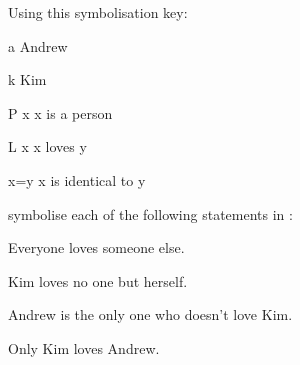 \documentclass[PHIL101-Textbook.tex]{subfiles}
\begin{document}
\pagebreak
\practiceproblems
\solutions
\problempart
Using this symbolisation key:
\begin{ekey}
\item[a] Andrew
\item[k] Kim 
\item[\atom P x] x is a person
\item[\atom L x ] x loves y
\item[x=y] x is identical to y
\end{ekey}
symbolise each of the following statements in \pl:
\begin{earg}
\item Everyone loves someone else.
\item Kim loves no one but herself.
\item Andrew is the only one who doesn't love Kim.
\item Only Kim loves Andrew.
\end{earg}


\end{document}
